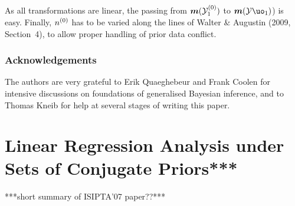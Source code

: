 As all transformations are linear, the passing from $\boldsymbol{m}({\cal Y}^{(0)}_1)$ to $\bs{m}({\cal Y}\uo_1)$) is easy.
Finally, $n^{(0)}$ has to be varied along the lines of Walter \& Augustin (2009, Section~4), to allow proper handling of prior data conflict.
\fi

\subsubsection*{Acknowledgements}

The authors are very grateful to Erik Quaeghebeur and Frank Coolen for intensive discussions on foundations of generalised Bayesian
inference, and to Thomas Kneib for help at several stages of writing this paper.


\section{Linear Regression Analysis under Sets of Conjugate Priors***}

***short summary of ISIPTA'07 paper??***

